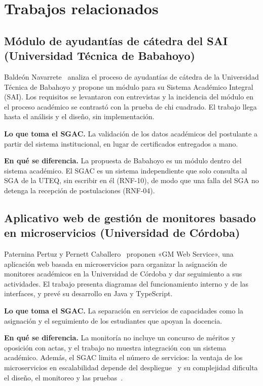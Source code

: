 \section{Trabajos relacionados}
\label{sec:trabajos-relacionados}

\subsection{Módulo de ayudantías de cátedra del SAI (Universidad Técnica de Babahoyo)}

Baldeón Navarrete~\cite{baldeon2022sai} analiza el proceso de ayudantías de cátedra de la Universidad Técnica de Babahoyo y propone un módulo para su Sistema Académico Integral (SAI). Los requisitos se levantaron con entrevistas y la incidencia del módulo en el proceso académico se contrastó con la prueba de chi cuadrado. El trabajo llega hasta el análisis y el diseño, sin implementación.

\textbf{Lo que toma el SGAC.} La validación de los datos académicos del postulante a partir del sistema institucional, en lugar de certificados entregados a mano.

\textbf{En qué se diferencia.} La propuesta de Babahoyo es un módulo dentro del sistema académico. El SGAC es un sistema independiente que solo consulta al SGA de la UTEQ, sin escribir en él (RNF-10), de modo que una falla del SGA no detenga la recepción de postulaciones (RNF-04).

\subsection{Aplicativo web de gestión de monitores basado en microservicios (Universidad de Córdoba)}

Paternina Pertuz y Pernett Caballero~\cite{paternina2024monitores} proponen «GM Web Service», una aplicación web basada en microservicios para organizar la asignación de monitores académicos en la Universidad de Córdoba y dar seguimiento a sus actividades. El trabajo presenta diagramas del funcionamiento interno y de las interfaces, y prevé su desarrollo en Java y TypeScript.

\textbf{Lo que toma el SGAC.} La separación en servicios de capacidades como la asignación y el seguimiento de los estudiantes que apoyan la docencia.

\textbf{En qué se diferencia.} La monitoría no incluye un concurso de méritos y oposición con actas, y el trabajo no muestra integración con un sistema académico. Además, el SGAC limita el número de servicios: la ventaja de los microservicios en escalabilidad depende del despliegue~\cite{blinowski2022monolithic} y su complejidad dificulta el diseño, el monitoreo y las pruebas~\cite{waseem2021design}.

